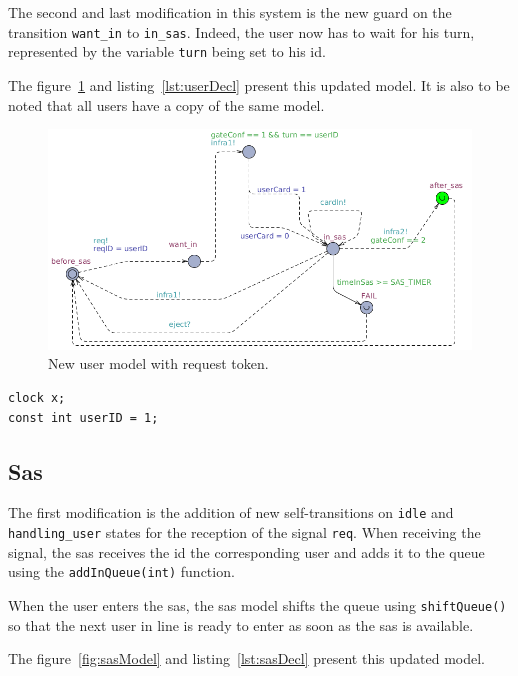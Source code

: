 \documentclass[10pt,a4paper]{article}
\begin{document}
The second and last modification in this system is the new guard on the transition \texttt{want\_in} to \texttt{in\_sas}. Indeed, the user now has to wait for his turn, represented by the variable \texttt{turn} being set to his id.

The figure~\ref{fig:userModel} and listing~\ref{lst:userDecl} present this updated model. It is also to be noted that all users have a copy of the same model.

\begin{figure}[!h]
	\centering
    \includegraphics[width=\textwidth]{userModel}
    \caption{New user model with request token.}
    \label{fig:userModel}
\end{figure}

\begin{lstlisting}[caption=Declarations of user model., label=lst:userDecl]
clock x;
const int userID = 1;
\end{lstlisting}

\subsection{Sas}
The first modification is the addition of new self-transitions on \texttt{idle} and \texttt{handling\_user} states for the reception of the signal \texttt{req}.
When receiving the signal, the sas receives the id the corresponding user and adds it to the queue using the \texttt{addInQueue(int)} function.

When the user enters the sas, the sas model shifts the queue using \texttt{shiftQueue()} so that the next user in line is ready to enter as soon as the sas is available.

The figure~\ref{fig:sasModel} and listing~\ref{lst:sasDecl} present this updated model.
\end{document}
